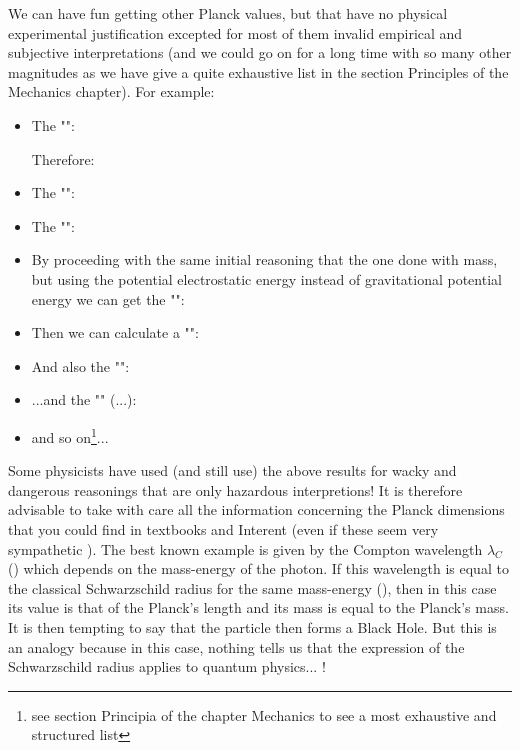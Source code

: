 	We can have fun getting other Planck values, but that have no physical experimental justification excepted for most of them invalid empirical and subjective interpretations (and we could go on for a long time with so many other magnitudes as we have give a quite exhaustive list in the section Principles of the Mechanics chapter). For example:
	\begin{itemize}
		\item The "":
		
		Therefore:
		
	
		\item The "":
		
	
		\item The "":
		
		
		\item By proceeding with the same initial reasoning that the one done with mass, but using the potential electrostatic energy instead of gravitational potential energy we can get the "":
		

		\item Then we can calculate a "":
		
		
		\item And also the "":
		
		
		\item ...and the "" (...):
		
	
		\item and so on\footnote{see section Principia of the chapter Mechanics to see a most exhaustive and structured list}...
	\end{itemize}
	\begin{tcolorbox}[title=Remark,colframe=black,arc=10pt]
	Some physicists have used (and still use) the above results for wacky and dangerous reasonings that are only hazardous interpretions! It is therefore advisable to take with care all the information concerning the Planck dimensions  that you could find in textbooks and Interent (even if these seem very sympathetic ). The best known example is given by the Compton wavelength $\lambda_C$ () which depends on the mass-energy of the photon. If this wavelength is equal to the classical Schwarzschild radius for the same mass-energy (), then in this case its value is that of the Planck's length and its mass is equal to the Planck's mass. It is then tempting to say that the particle then forms a Black Hole. But this is an analogy because in this case, nothing tells us that the expression of the Schwarzschild radius applies to quantum physics... !
	\end{tcolorbox}
	
